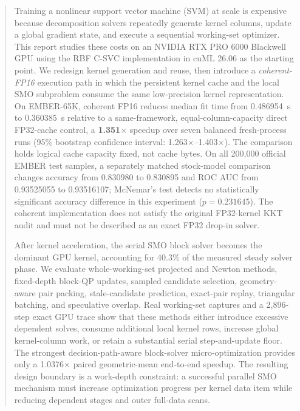 \begin{abstract}
Training a nonlinear support vector machine (SVM) at scale is expensive
because decomposition solvers repeatedly generate kernel columns, update a
global gradient state, and execute a sequential working-set optimizer. This
report studies these costs on an NVIDIA RTX PRO 6000 Blackwell GPU using the
RBF C-SVC implementation in cuML 26.06 as the starting point. We redesign
kernel generation and reuse, then introduce a \emph{coherent-FP16} execution
path in which the persistent kernel cache and the local SMO subproblem consume
the same low-precision kernel representation. On EMBER-65K, coherent FP16
reduces median fit time from \SI{0.486954}{s} to \SI{0.360385}{s} relative to a
same-framework, equal-column-capacity direct FP32-cache control, a
\textbf{1.351$\times$} speedup over seven balanced fresh-process runs (95\%
bootstrap confidence interval: 1.263$\times$--1.403$\times$). The comparison
holds logical cache capacity fixed, not cache bytes. On all 200,000 official
EMBER test samples, a separately matched stock-model comparison changes
accuracy from 0.830980 to 0.830895 and ROC AUC from 0.93525055 to 0.93516107;
McNemar's test detects no statistically significant accuracy difference in
this experiment ($p=0.231645$). The coherent implementation does not satisfy
the original FP32-kernel KKT audit and must not be described as an exact FP32
drop-in solver.

After kernel acceleration, the serial SMO block solver becomes the dominant
GPU kernel, accounting for 40.3\% of the measured steady solver phase. We
evaluate whole-working-set projected and Newton methods, fixed-depth block-QP
updates, sampled candidate selection, geometry-aware pair packing,
stale-candidate prediction, exact-pair replay, triangular batching, and
speculative overlap. Real working-set captures and a 2,896-step exact GPU
trace show that these methods either introduce excessive dependent solves,
consume additional local kernel rows, increase global kernel-column work, or
retain a substantial serial step-and-update floor. The strongest
decision-path-aware block-solver micro-optimization provides only a
1.0376$\times$ paired geometric-mean end-to-end speedup. The resulting design
boundary is a work-depth constraint: a successful parallel SMO mechanism must
increase optimization progress per kernel data item while reducing dependent
stages and outer full-data scans.
\end{abstract}
